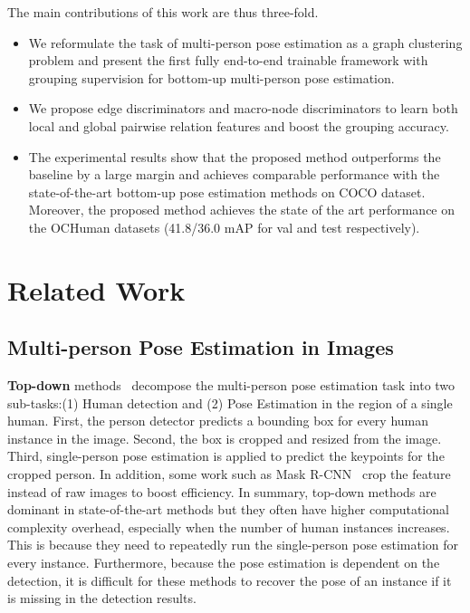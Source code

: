 \documentclass[runningheads]{llncs}
\begin{document}
	The main contributions of this work are thus three-fold.	
	\begin{itemize}
		\itemsep 0.1cm
		\item We reformulate the task of multi-person pose estimation as a graph clustering problem and present the first fully end-to-end trainable framework with grouping supervision for bottom-up multi-person pose estimation.
		\item We propose edge discriminators and macro-node discriminators to learn both local and global pairwise relation features and boost the grouping accuracy. 
		\item The experimental results show that the proposed method outperforms the baseline by a large margin and achieves comparable performance with the state-of-the-art bottom-up pose estimation methods on COCO dataset. Moreover, the proposed method achieves the state of the art performance on the OCHuman datasets (41.8/36.0 mAP for val and test respectively).
	\end{itemize}
	
	\section{Related Work}
	\label{sec:related_work}
	
	\subsection{Multi-person Pose Estimation in Images}
	\textbf{Top-down} methods~\cite{chen2018cascaded,fang2017rmpe,he2017mask,huang2017coarse,li2019crowdpose,liu2018cascaded,papandreou2017towards,sun2019deep,xiao2018simple} decompose the multi-person pose estimation task into two sub-tasks:(1) Human detection and (2) Pose Estimation in the region of a single human. 
	First, the person detector predicts a bounding box for every human instance in the image. Second, the box is cropped and resized from the image. Third, single-person pose estimation is applied to predict the keypoints for the cropped person. 
	In addition, some work such as Mask R-CNN~\cite{he2017mask} crop the feature instead of raw images to boost efficiency. 
	In summary, top-down methods are dominant in state-of-the-art methods but they often have higher computational complexity overhead, especially when the number of human instances increases. This is because they need to repeatedly run the single-person pose estimation for every instance. Furthermore, because the pose estimation is dependent on the detection, it is difficult for these methods to recover the pose of an instance if it is missing in the detection results.
	
\end{document}
